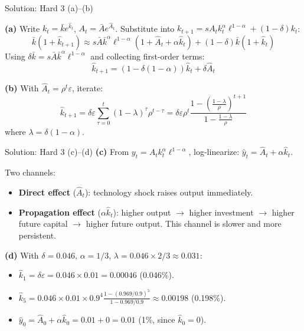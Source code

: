 \documentclass[aspectratio=169,10pt]{beamer}
\newcommand{\backbutton}[1]{\hfill\hyperlink{#1}{\beamerbutton{Back}}}
\begin{document}
\begin{frame}{Solution: Hard 3 (a)--(b)}
\hypertarget{s-h3}{}

\textbf{(a)} Write $k_t = \bar{k}e^{\hat{k}_t}$, $A_t = \bar{A}e^{\hat{A}_t}$. Substitute into $k_{t+1}=sA_tk_t^\alpha\ell^{1-\alpha}+(1-\delta)k_t$:
\[
\bar{k}(1+\hat{k}_{t+1}) \approx s\bar{A}\bar{k}^\alpha\ell^{1-\alpha}(1+\hat{A}_t+\alpha\hat{k}_t) + (1-\delta)\bar{k}(1+\hat{k}_t)
\]
Using $\delta\bar{k} = s\bar{A}\bar{k}^\alpha\ell^{1-\alpha}$ and collecting first-order terms:
\[
\hat{k}_{t+1} = (1-\delta(1-\alpha))\hat{k}_t + \delta\hat{A}_t
\]

\textbf{(b)} With $\hat{A}_t = \rho^t\varepsilon$, iterate:
\[
\hat{k}_{t+1} = \delta\varepsilon\sum_{\tau=0}^{t}(1-\lambda)^\tau \rho^{t-\tau} = \delta\varepsilon\rho^t\frac{1-\left(\frac{1-\lambda}{\rho}\right)^{t+1}}{1-\frac{1-\lambda}{\rho}}
\]
where $\lambda = \delta(1-\alpha)$.
\end{frame}

\begin{frame}{Solution: Hard 3 (c)--(d)}
\textbf{(c)} From $y_t = A_tk_t^\alpha\ell^{1-\alpha}$, log-linearize: $\hat{y}_t = \hat{A}_t + \alpha\hat{k}_t$.

Two channels:
\begin{itemize}
  \item \textbf{Direct effect} ($\hat{A}_t$): technology shock raises output immediately.
  \item \textbf{Propagation effect} ($\alpha\hat{k}_t$): higher output $\to$ higher investment $\to$ higher future capital $\to$ higher future output. This channel is slower and more persistent.
\end{itemize}

\textbf{(d)} With $\delta=0.046$, $\alpha=1/3$, $\lambda=0.046\times 2/3\approx 0.031$:
\begin{itemize}
  \item $\hat{k}_1 = \delta\varepsilon = 0.046\times 0.01 = 0.00046$ (0.046\%).
  \item $\hat{k}_5 = 0.046\times 0.01\times 0.9^4 \frac{1-(0.969/0.9)^5}{1-0.969/0.9} \approx 0.00198$ (0.198\%).
  \item $\hat{y}_0 = \hat{A}_0 + \alpha\hat{k}_0 = 0.01 + 0 = 0.01$ (1\%, since $\hat{k}_0=0$).
\end{itemize}
\backbutton{q-h3}
\end{frame}
\end{document}
